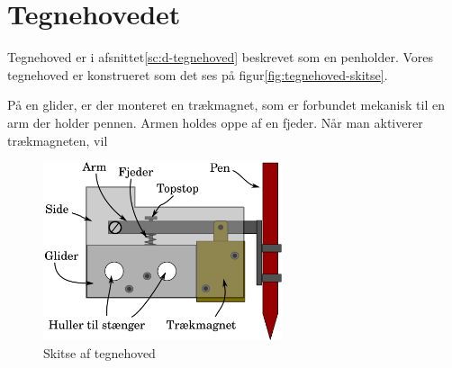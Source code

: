 \section{Tegnehovedet}
\label{sc:i-tegnehovedet}
Tegnehoved er i afsnittet\vref{sc:d-tegnehoved} beskrevet som en
penholder. Vores tegnehoved er konstrueret som det ses på
figur\vref{fig:tegnehoved-skitse}.

På en glider, er der monteret en trækmagnet, som er forbundet mekanisk
til en arm der holder pennen. Armen holdes oppe af en fjeder. Når man
aktiverer trækmagneten, vil

\begin{figure}[htbp]
  \centering
  \includegraphics[width=7cm]{./img/tegnehoved-skitse}
  \caption{Skitse af tegnehoved}
  \label{fig:tegnehoved-skitse}
\end{figure}


